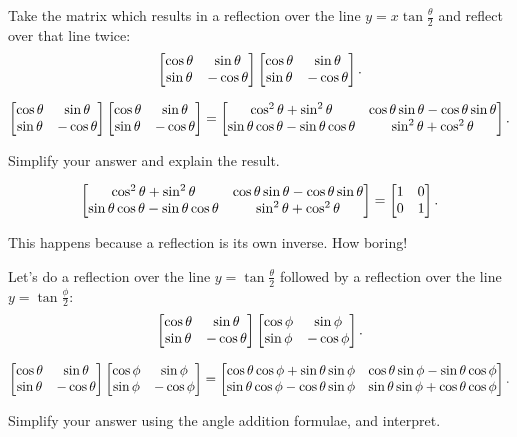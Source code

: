 \documentclass[../gatm_answers.tex]{subfiles}
\begin{document}
\begin{inner_problem}[start=1]
\item Take the matrix which results in a reflection over the line $y=x\tan \frac{\theta}{2}$ and reflect over that line twice: $$\begin{bmatrix} \cos\theta & \sin\theta \\ \sin\theta & -\cos\theta \end{bmatrix}\begin{bmatrix} \cos\theta & \sin\theta \\ \sin\theta & -\cos\theta \end{bmatrix}.$$
\end{inner_problem}

$$\begin{bmatrix} \cos\theta & \sin\theta \\ \sin\theta & -\cos\theta \end{bmatrix}\begin{bmatrix} \cos\theta & \sin\theta \\ \sin\theta & -\cos\theta \end{bmatrix} = \begin{bmatrix} \cos^2\theta + \sin^2\theta & \cos\theta\sin\theta-\cos\theta\sin\theta \\ \sin\theta\cos\theta - \sin\theta\cos\theta & \sin^2\theta + \cos^2\theta\end{bmatrix}.$$

\begin{inner_problem}
\item Simplify your answer and explain the result.
\end{inner_problem}

$$\begin{bmatrix} \cos^2\theta + \sin^2\theta & \cos\theta\sin\theta-\cos\theta\sin\theta \\ \sin\theta\cos\theta - \sin\theta\cos\theta & \sin^2\theta + \cos^2\theta\end{bmatrix} = \begin{bmatrix} 1 & 0 \\ 0 & 1 \end{bmatrix}.$$

This happens because a reflection is its own inverse. How boring!

\begin{inner_problem}
\item Let's do a reflection over the line $y=\tan\frac{\theta}{2}$ followed by a reflection over the line $y=\tan\frac{\phi}{2}$:
$$\begin{bmatrix} \cos\theta & \sin\theta \\ \sin\theta & -\cos\theta \end{bmatrix}\begin{bmatrix} \cos\phi & \sin\phi \\ \sin\phi & -\cos\phi \end{bmatrix}.$$
\end{inner_problem}

$$\begin{bmatrix} \cos\theta & \sin\theta \\ \sin\theta & -\cos\theta \end{bmatrix}\begin{bmatrix} \cos\phi & \sin\phi \\ \sin\phi & -\cos\phi \end{bmatrix} = \begin{bmatrix}
\cos\theta\cos\phi + \sin\theta\sin\phi & \cos\theta\sin\phi-\sin\theta\cos\phi \\ \sin\theta\cos\phi-\cos\theta\sin\phi & \sin\theta\sin\phi + \cos\theta\cos\phi
\end{bmatrix}.$$

\begin{inner_problem}
\item Simplify your answer using the angle addition formulae, and interpret.
\end{inner_problem}
\end{document}
